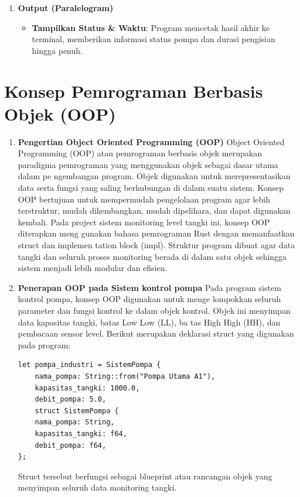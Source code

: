 \documentclass[12pt,a4paper]{article}
\begin{document}
\begin{enumerate}
    \item \textbf{Output (Paralelogram)}
    \begin{itemize}
        \item \textbf{Tampilkan Status \& Waktu}: Program mencetak hasil akhir ke terminal, memberikan informasi status pompa dan durasi pengisian hingga penuh.
    \end{itemize}
\end{enumerate}

\newpage

\section{Konsep Pemrograman Berbasis Objek (OOP)}
\begin{enumerate}
    \item \textbf{Pengertian Object Oriented Programming (OOP)} 
    Object Oriented Programming (OOP) atau pemrograman berbasis objek merupakan
paradigma pemrograman yang menggunakan objek sebagai dasar utama dalam pe
ngembangan program. Objek digunakan untuk merepresentasikan data serta fungsi
yang saling berhubungan di dalam suatu sistem. Konsep OOP bertujuan untuk
mempermudah pengelolaan program agar lebih terstruktur, mudah dikembangkan,
mudah dipelihara, dan dapat digunakan kembali.
Pada project sistem monitoring level tangki ini, konsep OOP diterapkan meng
gunakan bahasa pemrograman Rust dengan memanfaatkan struct dan implemen
tation block (impl). Struktur program dibuat agar data tangki dan seluruh proses
monitoring berada di dalam satu objek sehingga sistem menjadi lebih modular dan
efisien.
    \item \textbf{Penerapan OOP pada Sistem kontrol pompa}
    Pada program sistem kontrol pompa, konsep OOP digunakan untuk menge
lompokkan seluruh parameter dan fungsi kontrol ke dalam objek kontrol.
Objek ini menyimpan data kapasitas tangki, batas Low Low (LL), ba
tas High High (HH), dan pembacaan sensor level.
Berikut merupakan deklarasi struct yang digunakan pada program:

\begin{lstlisting}
let pompa_industri = SistemPompa {
    nama_pompa: String::from("Pompa Utama A1"),
    kapasitas_tangki: 1000.0,
    debit_pompa: 5.0,
    struct SistemPompa {
    nama_pompa: String,
    kapasitas_tangki: f64,
    debit_pompa: f64,
};
\end{lstlisting}

Struct tersebut berfungsi sebagai blueprint atau rancangan objek yang menyimpan seluruh data monitoring tangki.


\end{enumerate}
\end{document}
